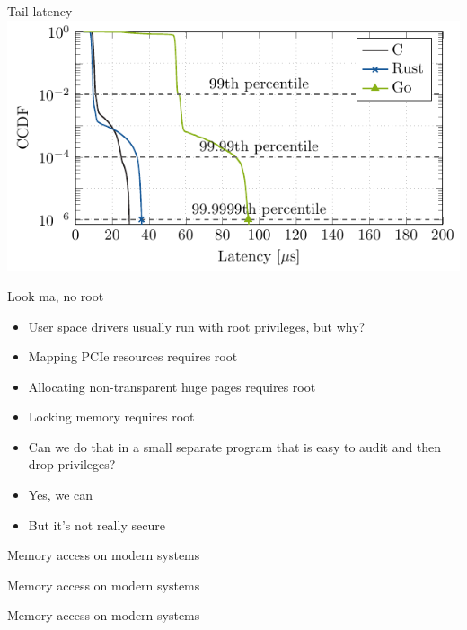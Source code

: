 \documentclass[NET,english,aspectratio=169,notitleframe]{tumbeamer}
\begin{document}
\begin{frame}{Tail latency}
\centering\includegraphics[scale=1.1]{figures/latency-20/latency-ccdf.pdf}
\end{frame}

\begin{frame}{Look ma, no root}
\begin{itemize}
\item User space drivers usually run with root privileges, but why?
\pause
\vspace{1em}
\item Mapping PCIe resources requires root
\item Allocating non-transparent huge pages requires root
\item Locking memory requires root
\vspace{1em}
\item Can we do that in a small separate program that is easy to audit and then drop privileges?
\pause
\item Yes, we can
\item But it's not really secure
\end{itemize}
\end{frame}

\begin{frame}{Memory access on modern systems}
\centering
\end{frame}

\begin{frame}{Memory access on modern systems}
\centering
\end{frame}

\begin{frame}{Memory access on modern systems}
\centering
\end{frame}
\end{document}
